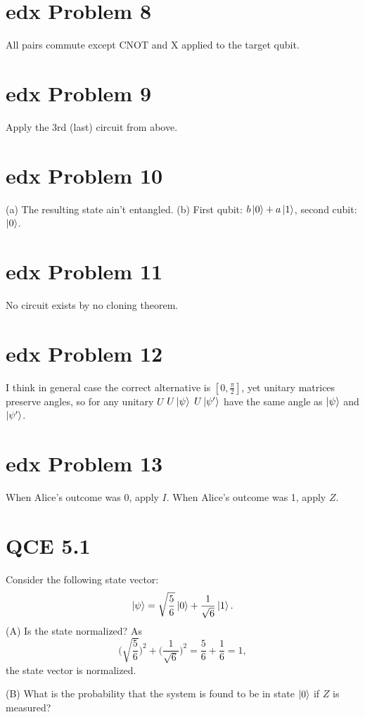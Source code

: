 \documentclass[10pt]{article}
\begin{document}
\section*{edx Problem 8}
All pairs commute except CNOT and X applied to the target qubit.

\section*{edx Problem 9}
Apply the 3rd (last) circuit from above.

\section*{edx Problem 10}
(a) The resulting state ain't entangled.
(b) First qubit: $b\ket{0} + a\ket{1}$, second cubit: $\ket{0}$.

\section*{edx Problem 11}
No circuit exists by no cloning theorem.

\section*{edx Problem 12}
I think in general case the correct alternative is $[0, \frac{\pi}{2}]$, yet unitary matrices preserve angles, so for any unitary $U$ $U\ket{\psi}$ $U\ket{\psi'}$ have the same angle as $\ket{\psi}$ and $\ket{\psi'}$.

\section*{edx Problem 13}
When Alice's outcome was 0, apply $I$. When Alice's outcome was 1, apply $Z$.

\section*{QCE 5.1}
Consider the following state vector:
\[
\ket{\psi} = \sqrt{\frac{5}{6}} \ket{0} + \frac{1}{\sqrt{6}} \ket{1}.
\]
(A) Is the state normalized?
As
\[
\Bigg( \sqrt{\frac{5}{6}} \Bigg)^2 + \Bigg( \frac{1}{\sqrt{6}} \Bigg)^2 = \frac{5}{6} + \frac{1}{6} = 1, 
\]
the state vector is normalized.

(B) What is the probability that the system is found to be in state $\ket{0}$ if $Z$ is measured? 
\end{document}
